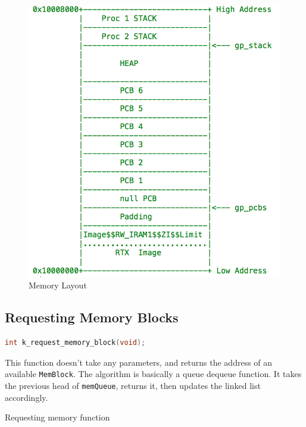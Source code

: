 \documentclass[12pt]{report}
\begin{document}
\begin{figure}[h!]
  \centering
	\includegraphics{memory.png}
\caption{Memory Layout}

\end{figure}

\subsection{Requesting Memory Blocks}

\begin{minipage}{\textwidth}
\begin{lstlisting}[language=C, frame=single]
int k_request_memory_block(void);
\end{lstlisting}
\end{minipage}

This function doesn't take any parameters, and returns the address of an available \texttt{MemBlock}. The algorithm is basically a queue dequeue function. It takes the previous head of \texttt{memQueue}, returns it, then updates the linked list accordingly.

\begin{algorithm}[H]
  \caption{Requesting memory function}
  \begin{algorithmic}[1]
	  \EndWhile
    \EndProcedure
  \end{algorithmic}
\end{algorithm}
\end{document}
